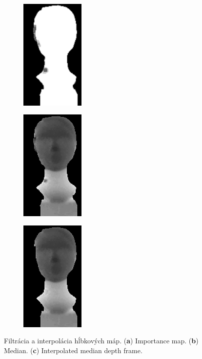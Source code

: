 \begin{figure}[h]
	\centering
	\begin{subfigure}[b]{0.32\textwidth}
		\centering
		\includegraphics[height=5.5cm]{figures/importance_map-a.png}
		\caption{}
		\label{fig:imap:a}
	\end{subfigure}
	\hfill
	\begin{subfigure}[b]{0.32\textwidth}
		\centering
		\includegraphics[height=5.5cm]{figures/importance_map-b.png}
		\caption{}
		\label{fig:imap:b}
	\end{subfigure}
	\hfill
	\begin{subfigure}[b]{0.32\textwidth}
		\centering
		\includegraphics[height=5.5cm]{figures/importance_map-c.png}
		\caption{}
		\label{fig:imap:c}
	\end{subfigure}
	\caption{Filtrácia a interpolácia hĺbkových máp. (\textbf{a}) Importance map. (\textbf{b}) Median. (\textbf{c}) Interpolated median depth frame.}
	\label{fig:imap}
\end{figure}

